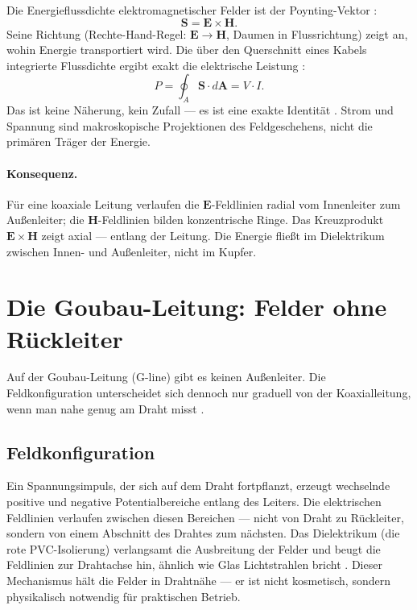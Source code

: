 Die Energieflussdichte elektromagnetischer Felder ist der Poynting-Vektor
\cite{Stratton1941,Griffiths1999}:
\[
  \mathbf{S} = \mathbf{E} \times \mathbf{H}.
\]
Seine Richtung (Rechte-Hand-Regel: $\mathbf{E} \to \mathbf{H}$, Daumen in
Flussrichtung) zeigt an, wohin Energie transportiert wird. Die über den
Querschnitt eines Kabels integrierte Flussdichte ergibt exakt die
elektrische Leistung \EM:
\[
  P = \oint_A \mathbf{S} \cdot d\mathbf{A} = V \cdot I.
\]
Das ist keine Näherung, kein Zufall --- es ist eine exakte Identität \cite{Griffiths1999}.
Strom und Spannung sind makroskopische Projektionen des Feldgeschehens,
nicht die primären Träger der Energie.

\paragraph{Konsequenz.}
Für eine koaxiale Leitung verlaufen die $\mathbf{E}$-Feldlinien radial
vom Innenleiter zum Außenleiter; die $\mathbf{H}$-Feldlinien bilden
konzentrische Ringe. Das Kreuzprodukt $\mathbf{E}\times\mathbf{H}$ zeigt
axial --- entlang der Leitung. Die Energie fließt im Dielektrikum zwischen
Innen- und Außenleiter, nicht im Kupfer.

\section{Die Goubau-Leitung: Felder ohne Rückleiter}

Auf der Goubau-Leitung (G-line) gibt es keinen Außenleiter. Die
Feldkonfiguration unterscheidet sich dennoch nur graduell von der
Koaxialleitung, wenn man nahe genug am Draht misst \EM.

\subsection*{Feldkonfiguration}

Ein Spannungsimpuls, der sich auf dem Draht fortpflanzt, erzeugt
wechselnde positive und negative Potentialbereiche entlang des Leiters.
Die elektrischen Feldlinien verlaufen zwischen diesen Bereichen --- nicht
von Draht zu Rückleiter, sondern von einem Abschnitt des Drahtes zum
nächsten. Das Dielektrikum (die rote PVC-Isolierung) verlangsamt die
Ausbreitung der Felder und beugt die Feldlinien zur Drahtachse hin,
ähnlich wie Glas Lichtstrahlen bricht \cite{Goubau1950,Harms1907}. Dieser Mechanismus hält die
Felder in Drahtnähe --- er ist nicht kosmetisch, sondern physikalisch
notwendig für praktischen Betrieb.

